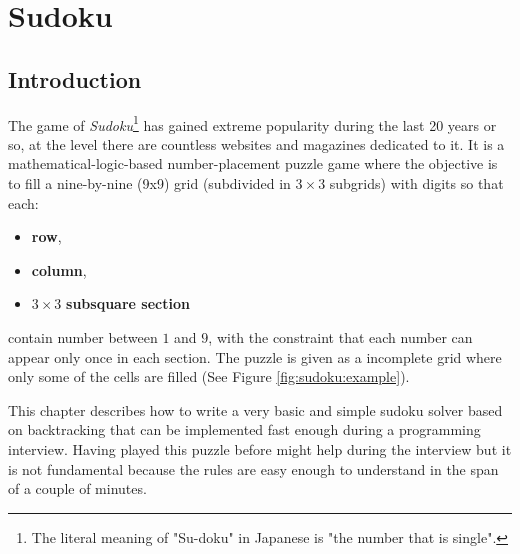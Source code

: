 %

\chapter{Sudoku}
\label{ch:sudoku}
\section*{Introduction}
The game of \textit{Sudoku}\footnote{The literal meaning of "Su-doku" in Japanese is "the number
that is single".} has gained extreme popularity during the last 20 years or so, at the level there
are countless websites and magazines dedicated to it. It is a mathematical-logic-based
number-placement puzzle game where the objective is to fill a nine-by-nine (9x9) grid (subdivided in
$3\times3$ subgrids) with digits so that each:
\begin{itemize}[]
	\item \textbf{row},
	\item \textbf{column},
	\item $3\times3$ \textbf{subsquare section}
\end{itemize}
contain number between $1$ and $9$, with the constraint that each number can appear only once in
each section. The puzzle is given as a incomplete grid where only some of the cells are filled (See
Figure \ref{fig:sudoku:example}).

This chapter describes how to write a very basic and simple sudoku solver based on backtracking that
can be implemented fast enough during a programming interview. Having played this puzzle before
might help during the interview but it is not fundamental because the rules are easy enough to
understand in the span of a couple of minutes.


